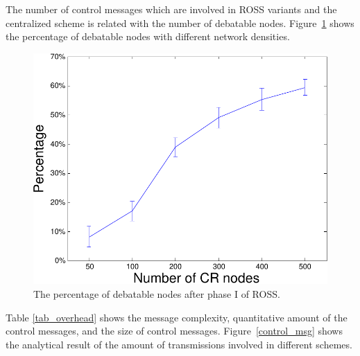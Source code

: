 \documentclass[10pt,journal,compsoc]{IEEEtran}
\theoremstyle{mytheoremstyle}
\theoremstyle{mytheoremstyle}
\theoremstyle{mytheoremstyle}
\begin{document}
The number of control messages which are involved in ROSS variants and the centralized scheme is related with the number of debatable nodes.
Figure~\ref{percentage_overlapping_node} shows the percentage of debatable nodes with different network densities.
\begin{figure}[ht!]
  \centering
  \includegraphics[width=0.6\linewidth]{percentage_overlapping_node.pdf}
  \caption{The percentage of debatable nodes after phase I of ROSS.}\label{percentage_overlapping_node}
\end{figure}
%
%
%
%
Table \ref{tab_overhead} shows the message complexity, quantitative amount of the control messages, and the size of control messages.
Figure~\ref{control_msg} shows the analytical result of the amount of transmissions involved in different schemes.
\end{document}
